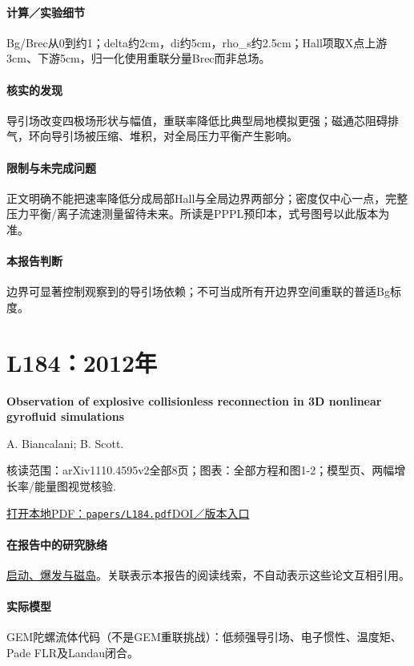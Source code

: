 \paragraph{计算／实验细节}Bg/Brec从0到约1；delta约2cm，di约5cm，rho\_s约2.5cm；Hall项取X点上游3cm、下游5cm，归一化使用重联分量Brec而非总场。

\paragraph{核实的发现}导引场改变四极场形状与幅值，重联率降低比典型局地模拟更强；磁通芯阻碍排气，环向导引场被压缩、堆积，对全局压力平衡产生影响。

\paragraph{限制与未完成问题}正文明确不能把速率降低分成局部Hall与全局边界两部分；密度仅中心一点，完整压力平衡/离子流速测量留待未来。所读是PPPL预印本，式号图号以此版本为准。

\paragraph{本报告判断}边界可显著控制观察到的导引场依赖；不可当成所有开边界空间重联的普适Bg标度。

\section{L184：2012年}\label{paper:L184}

\textbf{Observation of explosive collisionless reconnection in 3D nonlinear gyrofluid simulations}\citep{L184}\

A. Biancalani;  B. Scott.

\textsf{核读范围：}arXiv1110.4595v2全部8页；\textsf{图表：}全部方程和图1-2；模型页、两幅增长率/能量图视觉核验.

\href{run:papers/L184.pdf}{打开本地PDF：\texttt{papers/L184.pdf}}\quad\href{https://doi.org/10.1209/0295-5075/97/15005}{DOI／版本入口}

\paragraph{在报告中的研究脉络}\hyperref[story:onset]{启动、爆发与磁岛}。关联表示本报告的阅读线索，不自动表示这些论文互相引用。

\paragraph{实际模型}GEM陀螺流体代码（不是GEM重联挑战）：低频强导引场、电子惯性、温度矩、Pade FLR及Landau闭合。

